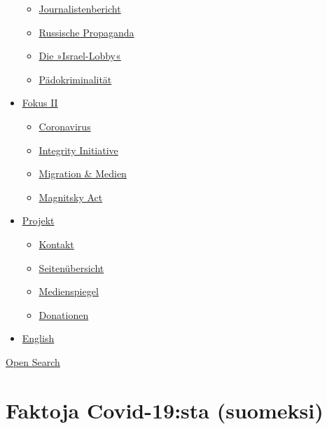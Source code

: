 \begin{itemize}
  \begin{itemize}
  \tightlist
  \item
    \href{https://swprs.org/bericht-eines-journalisten/}{Journalistenbericht}
  \item
    \href{https://swprs.org/russische-propaganda/}{Russische Propaganda}
  \item
    \href{https://swprs.org/die-israel-lobby-fakten-und-mythen/}{Die
    »Israel-Lobby«}
  \item
    \href{https://swprs.org/geopolitik-und-paedokriminalitaet/}{Pädokriminalität}
  \end{itemize}
\item
  \href{https://swprs.org/migration-und-medien/}{Fokus II}

  \begin{itemize}
  \tightlist
  \item
    \href{https://swprs.org/covid-19-hinweis-ii/}{Coronavirus}
  \item
    \href{https://swprs.org/die-integrity-initiative/}{Integrity
    Initiative}
  \item
    \href{https://swprs.org/migration-und-medien/}{Migration \& Medien}
  \item
    \href{https://swprs.org/der-fall-magnitsky/}{Magnitsky Act}
  \end{itemize}
\item
  \href{https://swprs.org/kontakt/}{Projekt}

  \begin{itemize}
  \tightlist
  \item
    \href{https://swprs.org/kontakt/}{Kontakt}
  \item
    \href{https://swprs.org/uebersicht/}{Seitenübersicht}
  \item
    \href{https://swprs.org/medienspiegel/}{Medienspiegel}
  \item
    \href{https://swprs.org/donationen/}{Donationen}
  \end{itemize}
\item
  \href{https://swprs.org/contact/}{English}
\end{itemize}

\protect\hyperlink{}{Open Search}

\hypertarget{faktoja-covid-19sta-suomeksi}{%
\section{Faktoja Covid-19:sta
(suomeksi)}\label{faktoja-covid-19sta-suomeksi}}

